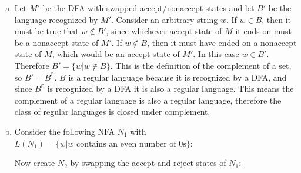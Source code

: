 \documentclass[10pt, legalpaper]{exam}
\begin{document}
\begin{questions}
\begin{enumerate}[(a)]
    \item Let \(M'\) be the DFA with swapped accept/nonaccept states and let \(B'\) be the language recognized by \(M'\). Consider an arbitrary string \(w\). If \(w \in B\), then it must be true that \(w \notin B'\), since whichever accept state of \(M\) it ends on must be a nonaccept state of \(M'\). If \(w \notin B\), then it must have ended on a nonaccept state of \(M\), which would be an accept state of \(M'\). In this case \(w \in B'\). Therefore \(B'=\{w|w \notin B\}\). This is the definition of the complement of a set, so \(B'=B^{\complement}\). \(B\) is a regular language because it is recognized by a DFA, and since \(B^{\complement}\) is recognized by a DFA it is also a regular language. This means the complement of a regular language is also a regular language, therefore the class of regular languages is closed under complement.

    \item Consider the following NFA \(N_{1}\) with \(L(N_{1})=\{w| w \textrm{ contains an even number of 0s}\}\): 
    \begin{center}       
    \end{center}
    
    Now create \(N_{2}\) by swapping the accept and reject states of \(N_{1}\):
    \begin{center}       
\end{center}
\end{enumerate}
\end{questions}
\end{document}
